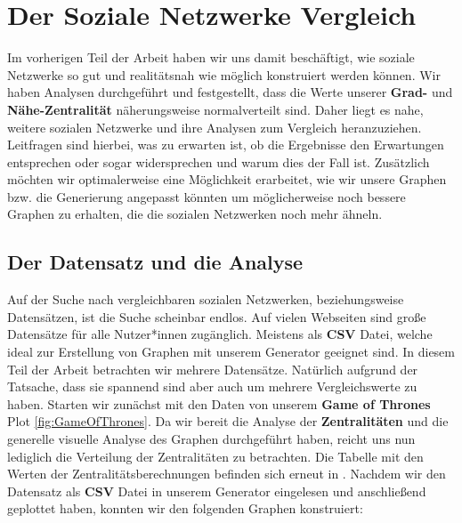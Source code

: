 \chapter{Der Soziale Netzwerke Vergleich}\label{ch:vergleich}

Im vorherigen Teil der Arbeit haben wir uns damit beschäftigt, wie soziale Netzwerke so gut und realitätsnah wie möglich konstruiert werden können. Wir haben Analysen durchgeführt und festgestellt, dass die Werte unserer \textbf{Grad-} und \textbf{Nähe-Zentralität} näherungsweise normalverteilt sind. Daher liegt es nahe, weitere sozialen Netzwerke und ihre Analysen zum Vergleich heranzuziehen. Leitfragen sind hierbei, was zu erwarten ist, ob die Ergebnisse den Erwartungen entsprechen oder sogar widersprechen und warum dies der Fall ist. Zusätzlich möchten wir optimalerweise eine Möglichkeit erarbeitet, wie wir unsere Graphen bzw. die Generierung angepasst könnten um möglicherweise noch bessere Graphen zu erhalten, die die sozialen Netzwerken noch mehr ähneln. 

\section{Der Datensatz und die Analyse}
Auf der Suche nach vergleichbaren sozialen Netzwerken, beziehungsweise Datensätzen, ist die Suche scheinbar endlos. Auf vielen Webseiten sind große Datensätze für alle Nutzer*innen zugänglich. Meistens als \textbf{CSV} Datei, welche ideal zur Erstellung von Graphen mit unserem Generator geeignet sind. In diesem Teil der Arbeit betrachten wir mehrere Datensätze. Natürlich aufgrund der Tatsache, dass sie spannend sind aber auch um mehrere Vergleichswerte zu haben. Starten wir zunächst mit den Daten \cite{GOT} von unserem \textbf{Game of Thrones} Plot \ref{fig:GameOfThrones}. Da wir bereit die Analyse der \textbf{Zentralitäten} und die generelle visuelle Analyse des Graphen durchgeführt haben, reicht uns nun lediglich die Verteilung der Zentralitäten zu betrachten. Die Tabelle mit den Werten der Zentralitätsberechnungen befinden sich erneut in \cite{TZ}. Nachdem wir den Datensatz als \textbf{CSV} Datei in unserem Generator eingelesen und anschließend geplottet haben, konnten wir den folgenden Graphen konstruiert:

